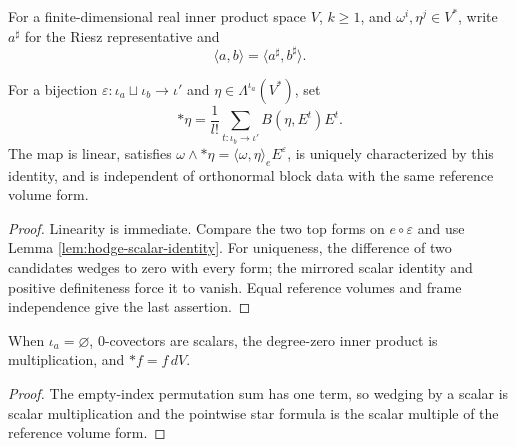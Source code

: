 For a finite-dimensional real inner product space $V$, $k\ge1$, and $\omega^i,\eta^j\in V^*$, write $a^\sharp$ for the Riesz representative and
\begin{equation}
\langle a,b\rangle=\langle a^\sharp,b^\sharp\rangle. \tag{2.26a}
\end{equation}

\begin{proposition}
\label{prop:hodge-star-pointwise}
\leanok
{}
For a bijection $\varepsilon:\iota_a\sqcup\iota_b\to\iota'$ and $\eta\in\Lambda^{\iota_a}(V^*)$, set
\[
{*}\eta=\frac1{l!}\sum_{t:\iota_b\to\iota'}B(\eta,E^t)E^t.
\]
The map is linear, satisfies $\omega\wedge {*}\eta=\langle\omega,\eta\rangle_eE^\varepsilon$, is uniquely characterized by this identity, and is independent of orthonormal block data with the same reference volume form.
\end{proposition}
\begin{proof}
\leanok
\sketch Linearity is immediate. Compare the two top forms on $e\circ\varepsilon$ and use Lemma \ref{lem:hodge-scalar-identity}. For uniqueness, the difference of two candidates wedges to zero with every form; the mirrored scalar identity and positive definiteness force it to vanish. Equal reference volumes and frame independence give the last assertion.
\end{proof}

\begin{proposition}
\label{prop:hodge-star-degree-zero}
\leanok
{}
When $\iota_a=\varnothing$, $0$-covectors are scalars, the degree-zero inner product is multiplication, and $*f=f\,dV$.
\end{proposition}
\begin{proof}
\leanok
\sketch The empty-index permutation sum has one term, so wedging by a scalar is scalar multiplication and the pointwise star formula is the scalar multiple of the reference volume form.
\end{proof}

